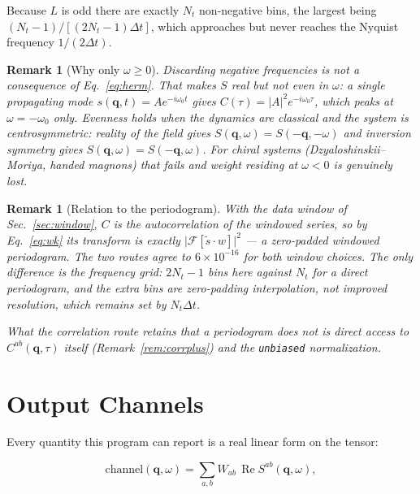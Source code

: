 \documentclass[12pt, a4paper, oneside]{article}
\newtheorem{remark}[theorem]{Remark}
\newcommand{\qvec}{\mathbf{q}}
\newcommand{\Nt}{N_t}
\begin{document}
Because $L$ is odd there are exactly $\Nt$ non-negative bins, the largest being
$(\Nt-1)/[(2\Nt-1)\Delta t]$, which approaches but never reaches the Nyquist
frequency $1/(2\Delta t)$.

\begin{remark}[Why only $\omega \ge 0$]
Discarding negative frequencies is not a consequence of Eq.~\eqref{eq:herm}.
That makes $S$ real but \emph{not} even in $\omega$: a single propagating mode
$s(\qvec,t) = Ae^{-i\omega_0 t}$ gives $C(\tau) = \lvert A\rvert^2
e^{-i\omega_0\tau}$, which peaks at $\omega = -\omega_0$ only. Evenness holds
when the dynamics are classical \emph{and} the system is centrosymmetric:
reality of the field gives $S(\qvec,\omega) = S(-\qvec,-\omega)$ and inversion
symmetry gives $S(\qvec,\omega) = S(-\qvec,\omega)$. For chiral systems
(Dzyaloshinskii--Moriya, handed magnons) that fails and weight residing at
$\omega < 0$ is genuinely lost.
\end{remark}

\begin{remark}[Relation to the periodogram]
With the data window of Sec.~\ref{sec:window}, $C$ is the autocorrelation of the
windowed series, so by Eq.~\eqref{eq:wk} its transform is exactly
$\lvert\mathcal{F}[\tilde s\cdot w]\rvert^2$ --- a zero-padded windowed
periodogram. The two routes agree to $6\times10^{-16}$ for both window choices.
The only difference is the frequency grid: $2\Nt-1$ bins here against $\Nt$ for
a direct periodogram, and the extra bins are zero-padding interpolation, not
improved resolution, which remains set by $\Nt\Delta t$.

What the correlation route retains that a periodogram does not is direct access
to $C^{ab}(\qvec,\tau)$ itself (Remark~\ref{rem:corrplus}) and the
\texttt{unbiased} normalization.
\end{remark}

\section{Output Channels}
\label{sec:channels}

Every quantity this program can report is a real linear form on the tensor:

\begin{equation}
\boxed{
    \text{channel}(\qvec,\omega)
    = \sum_{a,b} W_{ab}\,\operatorname{Re}S^{ab}(\qvec,\omega),
}
\label{eq:channel}
\end{equation}
\end{document}
